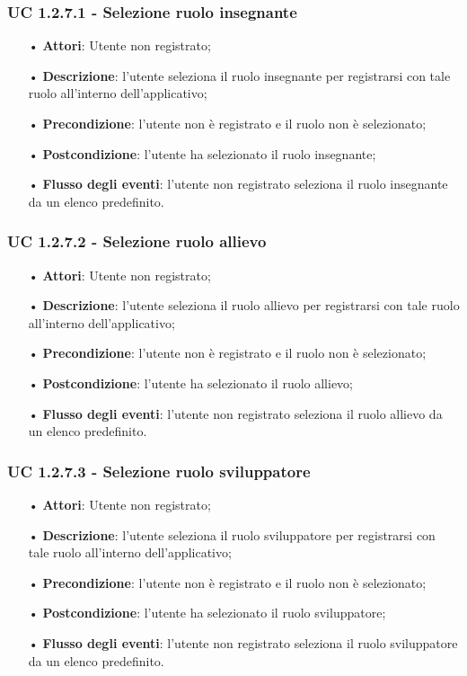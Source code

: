 \subsubsection{UC 1.2.7.1 - Selezione ruolo insegnante}
\begin{itemize}
	\item[•]\textbf{Attori}: Utente non registrato;
	\item[•]\textbf{Descrizione}: l'utente seleziona il ruolo insegnante per registrarsi con tale ruolo all'interno dell'applicativo;
	\item[•]\textbf{Precondizione}: l'utente non è registrato e il ruolo non è selezionato;
	\item[•]\textbf{Postcondizione}: l'utente ha selezionato il ruolo insegnante;
	\item[•]\textbf{Flusso degli eventi}: l'utente non registrato seleziona il ruolo insegnante da un elenco predefinito.
\end{itemize}
\subsubsection{UC 1.2.7.2 - Selezione ruolo allievo}
\begin{itemize}
	\item[•]\textbf{Attori}: Utente non registrato;
	\item[•]\textbf{Descrizione}: l'utente seleziona il ruolo allievo per registrarsi con tale ruolo all'interno dell'applicativo;
	\item[•]\textbf{Precondizione}: l'utente non è registrato e il ruolo non è selezionato;
	\item[•]\textbf{Postcondizione}: l'utente ha selezionato il ruolo allievo;
	\item[•]\textbf{Flusso degli eventi}: l'utente non registrato seleziona il ruolo allievo da un elenco predefinito.
\end{itemize}
\subsubsection{UC 1.2.7.3 - Selezione ruolo sviluppatore}
\begin{itemize}
	\item[•]\textbf{Attori}: Utente non registrato;
	\item[•]\textbf{Descrizione}: l'utente seleziona il ruolo sviluppatore per registrarsi con tale ruolo all'interno dell'applicativo;
	\item[•]\textbf{Precondizione}: l'utente non è registrato e il ruolo non è selezionato;
	\item[•]\textbf{Postcondizione}: l'utente ha selezionato il ruolo sviluppatore;
	\item[•]\textbf{Flusso degli eventi}: l'utente non registrato seleziona il ruolo sviluppatore da un elenco predefinito.
\end{itemize}


